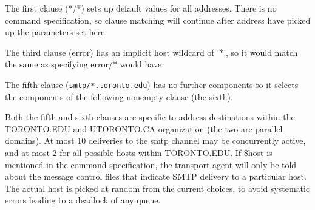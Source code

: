 

The  first  clause  (*/*)  sets up default values for all
addresses.  There is no command specification,  so  clause
matching  will  continue  after address have picked up the
parameters set here.

The third clause (error) has an implicit host wildcard  of
'*',  so  it  would  match  the same as specifying error/*
would have.

The fifth clause ({\tt smtp/*.toronto.edu}) has no further  
components so it selects the components of the following nonempty 
clause (the sixth).

Both the fifth and sixth clauses are specific  to  address
destinations  within the TORONTO.EDU and UTORONTO.CA 
organization (the two  are  parallel  domains).   At  most  10
deliveries to the smtp channel may be concurrently active,
and at most 2 for all possible hosts  within  TORONTO.EDU.
If \$host  is  mentioned in the command specification, the
transport agent will only be told about the  message  control  
files that indicate SMTP delivery to a particular
host. The actual host is picked at random from the  current  
choices, to avoid systematic errors leading to a deadlock of any queue.
